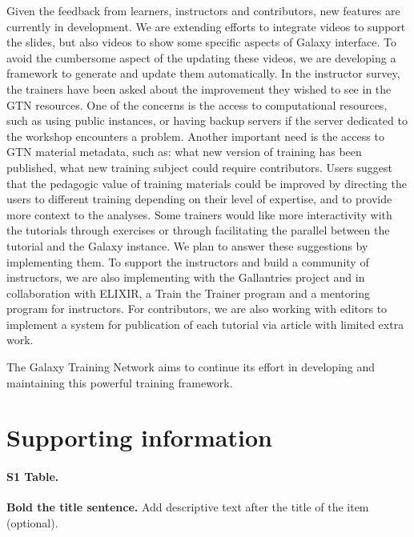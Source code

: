 \documentclass[10pt,letterpaper]{article}
\begin{document}
Given the feedback from learners, instructors and contributors, new features are currently in development. We are extending efforts to integrate videos to support the slides, but also videos to show some specific aspects of Galaxy interface. To avoid the cumbersome aspect of the updating these videos, we are developing a framework to generate and update them automatically.
In the instructor survey, the trainers have been asked about the improvement they wished to see in the GTN resources. One of the concerns is the access to computational resources, such as using public instances, or having backup servers if the server dedicated to the workshop encounters a problem.
Another important need is the access to GTN material metadata, such as: what new version of training has been published, what new training subject could require contributors. Users suggest that the pedagogic value of training materials could be improved by directing the users to different training depending on their level of expertise, and to provide more context to the analyses.
Some trainers would like more interactivity with the tutorials through exercises or through facilitating the parallel between the tutorial and the Galaxy instance. We plan to answer these suggestions by implementing them. 
To support the instructors and build a community of instructors, we are also implementing with the Gallantries project and in collaboration with ELIXIR, a Train the Trainer program and a mentoring program for instructors. For contributors, we are also working with editors to implement a system for publication of each tutorial via article with limited extra work.

The Galaxy Training Network aims to continue its effort in developing and maintaining this powerful training framework.

\section*{Supporting information}

\paragraph*{S1 Table.}
{\bf Bold the title sentence.} Add descriptive text after the title of the item (optional).
\end{document}
